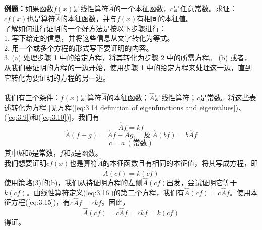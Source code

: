 	\begin{examplebox}
		\textbf{例题：}如果函数$f\left(x\right)$是线性算符$\hat{A}$的一个本征函数，$c$是任意常数。求证：$cf\left(x\right)$也是算符$\hat{A}$的本征函数，并与$f\left(x\right)$有相同的本征值。\\
		
		了解如何进行证明的一个好方法是按以下步骤进行：\\
		1. 写下给定的信息，并将这些信息从文字转化为等式。\\
		2. 用一个或多个方程的形式写下要证明的内容。\\
		3. (a) 处理步骤 1 中的给定方程，将其转化为步骤 2 中的所需方程。 (b) 或者，从我们要证明的方程的一边开始，使用步骤 1 中的给定方程来处理这一边，直到它转化为要证明的方程的另一边。\\
		\\
		我们有三个条件：$f\left(x\right)$是算符$\hat{A}$的本征函数；$\hat{A}$是线性算符；$c$是常数。将这些表述转化为方程 [见方程(\ref{eq:3.14 definition of eigenfunctions and eigenvalues})、(\ref{eq:3.9})和(\ref{eq:3.10})]，我们有
		\begin{equation}
			\hat{A} f = kf
			\label{eq:3.15}
		\end{equation}
		\begin{equation}
			\hat{A}\left(f+g\right) = \hat{A}f+\hat{A}g,\quad \text{及}\: \hat{A}\left(bf\right) = b\hat{A}f
			\label{eq:3.16}
		\end{equation}
		\begin{equation*}
			c = a \: \left(\text{常数}\right)
		\end{equation*}
		其中$k$和$b$是常数，$f$和$g$是函数。\\
		我们想要证明$cf\left(x\right)$也是算符$\hat{A}$的本征函数且有相同的本征值，将其写成方程，即
		\begin{equation*}
			\hat{A}\left(cf\right) = k\left(cf\right)
		\end{equation*}
		使用策略(3)的(b)，我们从待证明方程的左侧$\hat{A}\left(cf\right)$出发，尝试证明它等于$k\left(cf\right)$。由线性算符定义(\ref{eq:3.16})的第二个方程，我们有$\hat{A}\left(cf\right) = c\hat{A}f$。使用本征方程(\ref{eq:3.15})，有$c\hat{A}f = ckf$。因此，
		\begin{equation*}
			\hat{A}\left(cf\right) = c\hat{A}f = ckf= k\left(cf\right)
		\end{equation*}
		得证。
	\end{examplebox}
